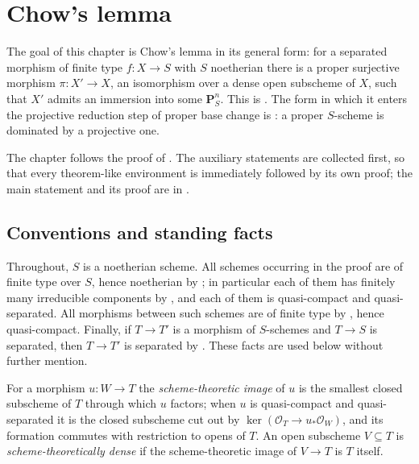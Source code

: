 %

\chapter{Chow's lemma}\label{chap:chow-lemma}

The goal of this chapter is Chow's lemma in its general form: for a separated
morphism of finite type $f\colon X\to S$ with $S$ noetherian there is a proper
surjective morphism $\pi\colon X'\to X$, an isomorphism over a dense open
subscheme of $X$, such that $X'$ admits an immersion into some
$\mathbf P^n_S$.  This is .  The form in which it enters
the projective reduction step of proper base change is
: a proper $S$-scheme is dominated by a projective
one.

The chapter follows the proof of .  The auxiliary
statements are collected first, so that every theorem-like environment is
immediately followed by its own proof; the main statement and its proof are in
.

\section{Conventions and standing facts}\label{sec:chow-conventions}

Throughout, $S$ is a noetherian scheme.  All schemes occurring in the proof are
of finite type over $S$, hence noetherian by ; in
particular each of them has finitely many irreducible components by
, and each of them is quasi-compact and quasi-separated.
All morphisms between such schemes are of finite type by ,
hence quasi-compact.  Finally, if $T\to T'$ is a morphism of $S$-schemes and
$T\to S$ is separated, then $T\to T'$ is separated by .
These facts are used below without further mention.

For a morphism $u\colon W\to T$ the \emph{scheme-theoretic image} of $u$ is the
smallest closed subscheme of $T$ through which $u$ factors; when $u$ is
quasi-compact and quasi-separated it is the closed subscheme cut out by
$\ker(\mathcal O_T\to u_*\mathcal O_W)$, and its formation commutes with
restriction to opens of $T$.  An open subscheme $V\subseteq T$ is
\emph{scheme-theoretically dense} if the scheme-theoretic image of $V\to T$ is
$T$ itself.

